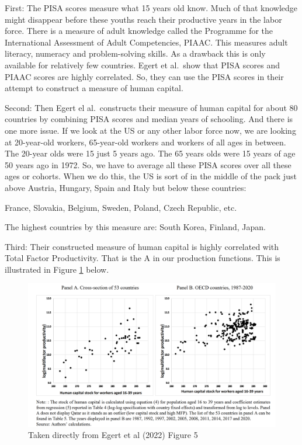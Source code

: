 \documentclass[
]{book}
\begin{document}
First: The PISA scores measure what 15 years old know. Much of that knowledge might disappear before these youths reach their productive years in the labor force. There is a measure of adult knowledge called the Programme for the International Assessment of Adult Competencies, PIAAC. This measures adult literacy, numeracy and problem-solving skills. As a drawback this is only available for relatively few countries. Egert et al.~show that PISA scores and PIAAC scores are highly correlated. So, they can use the PISA scores in their attempt to construct a measure of human capital.

Second: Then Egert el al.~constructs their measure of human capital for about 80 countries by combining PISA scores and median years of schooling. And there is one more issue. If we look at the US or any other labor force now, we are looking at 20-year-old workers, 65-year-old workers and workers of all ages in between. The 20-year olds were 15 just 5 years ago. The 65 years olds were 15 years of age 50 years ago in 1972. So, we have to average all these PISA scores over all these ages or cohorts. When we do this, the US is sort of in the middle of the pack just above Austria, Hungary, Spain and Italy but below these countries:

France, Slovakia, Belgium, Sweden, Poland, Czech Republic, etc.

The highest countries by this measure are: South Korea, Finland, Japan.

Third: Their constructed measure of human capital is highly correlated with Total Factor Productivity. That is the A in our production functions. This is illustrated in Figure \ref{fig:egertfig5} below.

\begin{figure}

{\centering \includegraphics[width=1\linewidth]{img/growth2/egertfig5} 

}

\caption{Taken directly from Egert et al (2022) Figure 5}\label{fig:egertfig5}
\end{figure}
\end{document}
